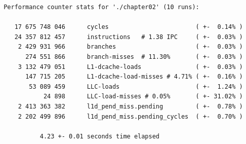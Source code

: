 \documentclass[12pt,a4paper,twoside,openright]{book}
\begin{document}
\begin{mdframed}[skipabove=\baselineskip,skipbelow=0pt,hidealllines=true,backgroundcolor=black!3,innerleftmargin=10pt,innerrightmargin=5pt,innertopmargin=0pt,innerbottommargin=5pt]
{\small
\begin{verbatim} Performance counter stats for './chapter02' (10 runs):

    17 675 748 046      cycles                        ( +-  0.14% )
    24 357 812 457      instructions   # 1.38 IPC     ( +-  0.03% )
     2 429 931 966      branches                      ( +-  0.03% )
       274 551 866      branch-misses  # 11.30%       ( +-  0.03% )
     3 132 479 051      L1-dcache-loads               ( +-  0.03% )
       147 715 205      L1-dcache-load-misses # 4.71% ( +-  0.16% )
        53 089 459      LLC-loads                     ( +-  1.24% )
            24 898      LLC-load-misses # 0.05%       ( +- 31.02% )
     2 413 363 382      l1d_pend_miss.pending         ( +-  0.78% )
     2 202 499 896      l1d_pend_miss.pending_cycles  ( +-  0.70% )

           4.23 +- 0.01 seconds time elapsed
\end{verbatim}
}
\end{mdframed}
\begin{mdframed}[skipabove=0pt,skipbelow=\baselineskip,hidealllines=true,innerleftmargin=10pt,innerrightmargin=5pt,innertopmargin=3pt,innerbottommargin=3pt]
\label{lst:perf_chapter02_1}
\end{mdframed}
\end{document}
